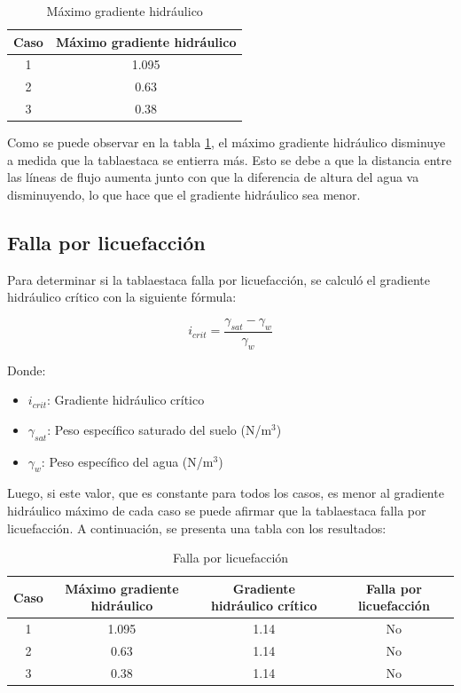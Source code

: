 \documentclass{article}
\begin{document}
\begin{table}[h!]
  \centering
  \begin{tabular}{cc}
    \hline
    \textbf{Caso} & \textbf{Máximo gradiente hidráulico} \\
    \hline
    1 & 1.095 \\
    2 & 0.63 \\
    3 & 0.38 \\
    \hline
  \end{tabular}
  \caption{Máximo gradiente hidráulico}
  \label{tab:gradiente}
\end{table}

Como se puede observar en la tabla \ref{tab:gradiente}, el máximo gradiente hidráulico disminuye a medida que la tablaestaca se entierra más. Esto se debe a que la distancia entre las líneas de flujo aumenta junto con que la diferencia de altura del agua va disminuyendo, lo que hace que el gradiente hidráulico sea menor. 

\subsection{Falla por licuefacción}

Para determinar si la tablaestaca falla por licuefacción, se calculó el gradiente hidráulico crítico con la siguiente fórmula:

\begin{equation}
  i_{crit} = \frac{\gamma_{sat}-\gamma_w}{\gamma_w} 
\end{equation}

Donde:
\begin{itemize}
    \item $i_{crit}$: Gradiente hidráulico crítico
    \item $\gamma_{sat}$: Peso específico saturado del suelo (N/m$^3$)
    \item $\gamma_w$: Peso específico del agua (N/m$^3$)  
\end{itemize}
Luego, si este valor, que es constante para todos los casos, es menor al gradiente hidráulico máximo de cada caso se puede afirmar que la tablaestaca falla por licuefacción. A continuación, se presenta una tabla con los resultados:

\begin{table}[h!]
  \centering
  \begin{tabular}{cccc}
    \hline
    \textbf{Caso} & \textbf{Máximo gradiente hidráulico}& \textbf{Gradiente hidráulico crítico} &\textbf{Falla por licuefacción} \\
    \hline
    1 &1.095 & 1.14 &No \\
    2 &0.63  & 1.14 &No \\
    3 &0.38  & 1.14 &No \\
    \hline
  \end{tabular}
  \caption{Falla por licuefacción}
  \label{tab:licuefaccion}
\end{table}
\end{document}
